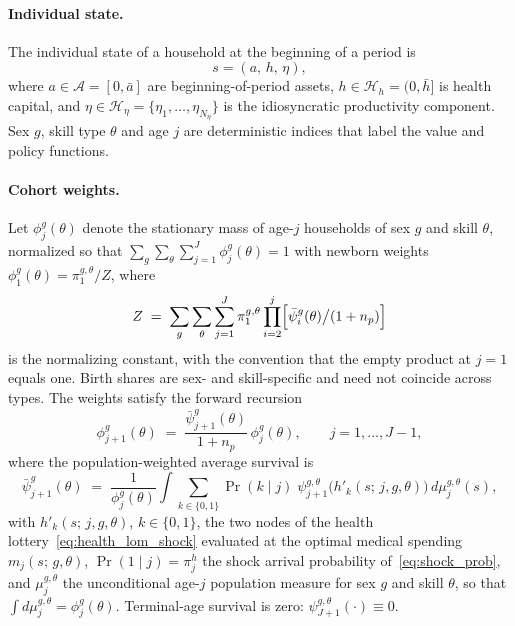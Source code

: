 \documentclass[12pt,a4paper]{article}
\begin{document}
\paragraph{Individual state.}
The individual state of a household at the beginning of a period is
\begin{equation}
\label{eq:state}
s = (a,\, h,\, \eta),
\end{equation}
where $a \in \mathcal{A} = [0, \bar{a}]$ are beginning-of-period assets, $h \in \mathcal{H}_h = (0, \bar{h}]$ is health capital, and $\eta \in \mathcal{H}_\eta = \{\eta_1, \ldots, \eta_{N_\eta}\}$ is the idiosyncratic productivity component. Sex $g$, skill type $\theta$ and age $j$ are deterministic indices that label the value and policy functions.

\paragraph{Cohort weights.}
Let $\phi_j^{g}(\theta)$ denote the stationary mass of age-$j$ households of sex $g$ and skill $\theta$, normalized so that $\sum_g \sum_\theta \sum_{j=1}^{J} \phi_{j}^{g}(\theta) = 1$ with newborn weights $\phi_{1}^{g}(\theta) = \pi^{g,\theta}_1 / Z$, where
\[
Z \;=\; \sum_{g}\sum_{\theta}\sum_{j=1}^{J} \pi^{g,\theta}_1 \prod_{i=2}^{j} \Bigl[\bar\psi_i^{g}(\theta) \big/ (1+n_p)\Bigr]
\]
is the normalizing constant, with the convention that the empty product at $j=1$ equals one. Birth shares are sex- and skill-specific and need not coincide across types. The weights satisfy the forward recursion
\begin{equation}
\label{eq:cohort_weights}
\phi_{j+1}^{g}(\theta) \;=\; \frac{\bar{\psi}_{j+1}^{g}(\theta)}{1 + n_p}\, \phi_{j}^{g}(\theta), \qquad j = 1, \ldots, J-1,
\end{equation}
where the population-weighted average survival is
\begin{equation}
\label{eq:avg_survival}
\bar{\psi}_{j+1}^{g}(\theta)
\;=\;
\frac{1}{\phi_{j}^{g}(\theta)} \int \sum_{k \in \{0,1\}} \Pr(k \mid j)\;
\psi_{j+1}^{g,\theta}\bigl(h'_k(s;\, j, g, \theta)\bigr)\, d\mu_j^{g,\theta}(s),
\end{equation}
with $h'_k(s;\, j, g, \theta)$, $k \in \{0,1\}$, the two nodes of the health lottery~\eqref{eq:health_lom_shock} evaluated at the optimal medical spending $m_j(s;\, g, \theta)$, $\Pr(1 \mid j) = \pi^h_j$ the shock arrival probability of~\eqref{eq:shock_prob}, and $\mu_{j}^{g,\theta}$ the unconditional age-$j$ population measure for sex $g$ and skill $\theta$, so that $\int d\mu_{j}^{g,\theta} = \phi_{j}^{g}(\theta)$. Terminal-age survival is zero: $\psi_{J+1}^{g,\theta}(\cdot) \equiv 0$.
\end{document}

